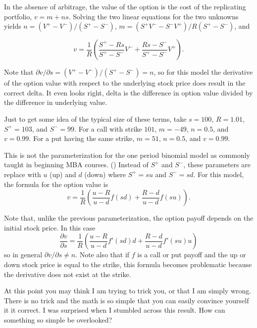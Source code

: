 \documentclass[12pt,fleqn]{amsart}
\begin{document}
In the absence of arbitrage, the value of the option is the cost of the
replicating portfolio, $v = m + ns$. Solving the two linear equations
for the two unknowns yields $n = (V^+ - V^-)/(S^+ - S^-)$, $m
= (S^+V^- - S^-V^+)/R(S^+ - S^-)$, and

\begin{equation}
v = \frac{1}{R}\left(\frac{S^+ - Rs}{S^+ - S^-} V^- 
		+ \frac{Rs - S^-}{S^+ - S^-} V^+\right).
\end{equation}

Note that $\partial v/\partial s = (V^+ - V^-)/(S^+ - S^-) = n$, so for
this model the derivative of the option value with respect to the
underlying stock price does result in the correct delta. It even
looks right, delta is the difference in option value divided by the difference
in underlying value.

Just to get some idea of the typical size of these terms, take $s = 100$,
$R = 1.01$, $S^+ = 103$, and $S^- = 99$. For a call with strike $101$,
$m = -49$, $n = 0.5$, and $v = 0.99$. For a put having the same
strike, $m = 51$, $n = 0.5$, and $v = 0.99$.

This is not the parameterization for the one period binomial model
as commonly taught in beginning MBA courses. (\cite{opb}) Instead of $S^+$
and $S^-$, these parameters are replace with $u$ (up) and $d$ (down)
where $S^+ = su$ and $S^- = sd$. For this model, the formula for the
option value is
\begin{equation}
v = \frac{1}{R}\left(\frac{u - R}{u - d} f(sd) 
		+ \frac{R - d}{u - d} f(su)\right).
\end{equation}

Note that, unlike the previous parameterization, the option
payoff depends on the initial stock price. In this case
\begin{equation*}
\frac{\partial v}{\partial s} = \frac{1}{R}
	\left(\frac{u - R}{u - d} f'(sd)d + \frac{R - d}{u - d} f'(su)u\right)
\end{equation*}
so in general $\partial v/\partial s \not= n$. Note also that if $f$ is
a call or put payoff and the up or down stock price is equal to the
strike, this formula becomes problematic because the derivative does
not exist at the strike.

At this point you may think I am trying to trick you, or that
I am simply wrong. There is no trick and the math is so simple
that you can easily convince yourself it it correct. I was surprised
when I stumbled across this result. How can something so simple
be overlooked?
\end{document}
